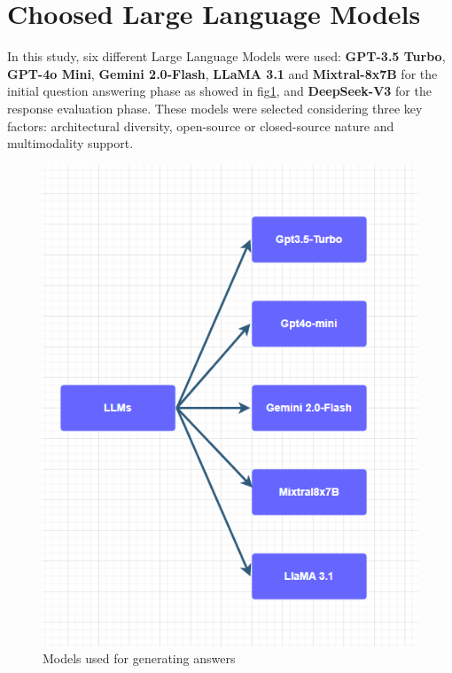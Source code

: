 \section{Choosed Large Language Models}
In this study, six different Large Language Models were used: \textbf{GPT-3.5 Turbo}, \textbf{GPT-4o Mini}, \textbf{Gemini 2.0-Flash}, \textbf{LLaMA 3.1} and \textbf{Mixtral-8x7B} for the initial question answering phase as showed in fig\ref{fig:models}, and \textbf{DeepSeek-V3} for the response evaluation phase. These models were selected considering three key factors: architectural diversity, open-source or closed-source nature and multimodality support.
\begin{figure}[H]
    \centering
    \includegraphics[width=0.7\linewidth]{Figures/Models.png}
    \caption{Models used for generating answers}
    \label{fig:models}
\end{figure}

